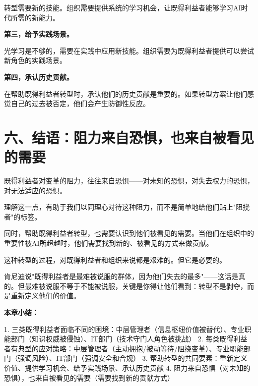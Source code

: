 转型需要新的技能。组织需要提供系统的学习机会，让既得利益者能够学习AI时代所需的新能力。

\textbf{第三，给予实践场景。}

光学习是不够的，需要在实践中应用新技能。组织需要为既得利益者提供可以尝试新角色的实践场景。

\textbf{第四，承认历史贡献。}

在帮助既得利益者转型时，承认他们的历史贡献是重要的。如果转型方案让他们感觉自己的过去被否定，他们会产生防御性反应。

\section{六、结语：阻力来自恐惧，也来自被看见的需要}


既得利益者对变革的阻力，往往来自恐惧——对未知的恐惧，对失去权力的恐惧，对无法适应的恐惧。

理解这一点，有助于我们以同理心对待这种阻力，而不是简单地给他们贴上"阻挠者"的标签。

同时，帮助既得利益者转型，也需要认识到他们被看见的需要。当他们在组织中的重要性被AI所超越时，他们需要找到新的、被看见的方式来做贡献。

这种转型的过程，对既得利益者和组织来说都是艰难的。但它是必要的。

肯尼迪说"既得利益者是最难被说服的群体，因为他们失去的最多"——这话是真的。但最难被说服不等于不能被说服，关键是你得让他们看到：转型不是剥夺，而是重新定义他们的价值。


\textbf{本章小结：}

1. 三类既得利益者面临不同的困境：中层管理者（信息枢纽价值被替代）、专业职能部门（知识权威被侵蚀）、IT部门（技术守门人角色被挑战）
2. 每类既得利益者有典型的应对策略：中层管理者（主动拥抱/被动等待/阻挠变革）、专业职能部门（强调风险）、IT部门（强调安全和合规）
3. 帮助转型的共同要素：重新定义价值、提供学习机会、给予实践场景、承认历史贡献
4. 阻力来自恐惧（对未知的恐惧），也来自被看见的需要（需要找到新的贡献方式）
